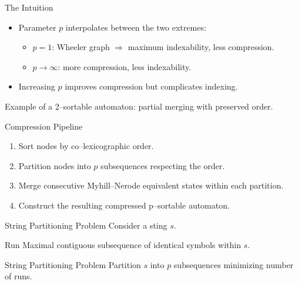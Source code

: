\documentclass[aspectratio=169]{beamer}
\begin{document}
\begin{frame}{The Intuition}
  \begin{itemize}
    \item Parameter $p$ interpolates between the two extremes:
      \begin{itemize}
        \item $p=1$: Wheeler graph $\Rightarrow$ maximum indexability, less compression.
        \item $p \to \infty$: more compression, less indexability.
      \end{itemize}
    \item Increasing $p$ improves compression but complicates indexing.
  \end{itemize}
  \vspace{0.3cm}
  \centering
  \small
  Example of a 2–sortable automaton: partial merging with preserved order.
\end{frame}

\begin{frame}{Compression Pipeline}
  \begin{enumerate}
    \item Sort nodes by co–lexicographic order.
    \item Partition nodes into $p$ subsequences respecting the order.
    \item Merge consecutive Myhill–Nerode equivalent states within each partition.
    \item Construct the resulting compressed p–sortable automaton.
  \end{enumerate}
  \centering
\end{frame}

\begin{frame}{String Partitioning Problem}
  Consider a sting $s$.
  \begin{block}{Run}
  Maximal contiguous subsequence of identical symbols within $s$. 
  \end{block}
  \begin{block}{String Partitioning Problem}
  Partition $s$ into $p$ subsequences minimizing number of runs. 
  \end{block}
  \centering
\end{frame}
\end{document}
